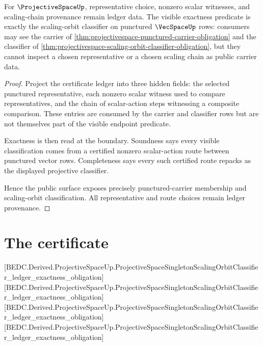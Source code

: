 \begin{theorem}
\label{thm:projectivespace-ledger-and-exactness-obligation}
For $\ProjectiveSpaceUp$, representative choice, nonzero scalar witnesses,
and scaling-chain provenance remain ledger data. The visible exactness
predicate is exactly the scaling-orbit classifier on punctured
$\VecSpaceUp$ rows: consumers may see the carrier of
\autoref{thm:projectivespace-punctured-carrier-obligation} and the classifier
of \autoref{thm:projectivespace-scaling-orbit-classifier-obligation}, but
they cannot inspect a chosen representative or a chosen scaling chain as
public carrier data.
\end{theorem}
\begin{proof}
Project the certificate ledger into three hidden fields: the selected
punctured representative, each nonzero scalar witness used to compare
representatives, and the chain of scalar-action steps witnessing a composite
comparison. These entries are consumed by the carrier and classifier rows but
are not themselves part of the visible endpoint predicate.

Exactness is then read at the boundary. Soundness says every visible
classification comes from a certified nonzero scalar-action route between
punctured vector rows. Completeness says every such certified route repacks as
the displayed projective classifier.

Hence the public surface exposes precisely punctured-carrier membership and
scaling-orbit classification. All representative and route choices remain
ledger provenance.
\end{proof}

\section{The certificate}
\label{sec:projectivespace-certificate}

[BEDC.Derived.ProjectiveSpaceUp.ProjectiveSpaceSingletonScalingOrbitClassifier\_ledger\_exactness\_obligation]
[BEDC.Derived.ProjectiveSpaceUp.ProjectiveSpaceSingletonScalingOrbitClassifier\_ledger\_exactness\_obligation]
[BEDC.Derived.ProjectiveSpaceUp.ProjectiveSpaceSingletonScalingOrbitClassifier\_ledger\_exactness\_obligation]
[BEDC.Derived.ProjectiveSpaceUp.ProjectiveSpaceSingletonScalingOrbitClassifier\_ledger\_exactness\_obligation]

